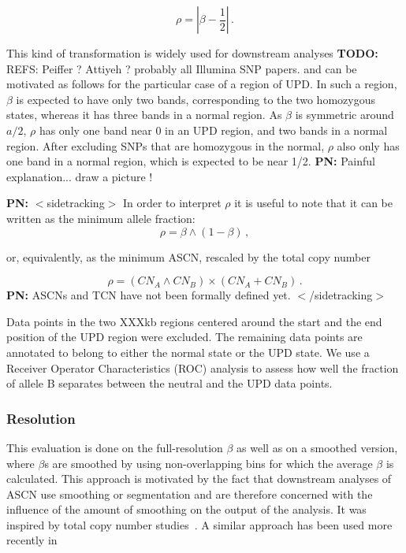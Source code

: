 \documentclass[10pt]{bmc_article}
\newenvironment{bmcformat}{\fussy\setboolean{publ}{true}}{\fussy}
\newenvironment{TODO}{\color{red}\textbf{TODO:}}{}
\newenvironment{PN}{\color{blue}\textbf{PN:}}{}
\begin{document}
\begin{bmcformat}
\begin{displaymath}
  \rho = \left\vert \beta - \frac{1}{2} \right\vert \,.
\end{displaymath}

This kind of transformation is widely used for downstream analyses
\begin{TODO}
  REFS: Peiffer ? Attiyeh ? probably all Illumina SNP papers.
\end{TODO}
 and can be motivated as follows for the particular case of a region of UPD. In such a region, $\beta$ is expected to have only two bands, corresponding to the two homozygous states, whereas it has three bands in a normal region. As $\beta$ is symmetric around $a/2$, $\rho$ has only one band near 0 in an UPD region, and two bands in a normal region. After excluding SNPs that are homozygous in the normal, $\rho$ also only has one band in a normal region, which is expected to be near 1/2. 
 \begin{PN}
   Painful explanation... draw a picture !
 \end{PN}

 \begin{PN}
   $<$sidetracking$>$
 \end{PN}
In order to interpret $\rho$ it is useful to note that it can be written as the minimum allele fraction:
\begin{displaymath}
  \rho = \beta \wedge (1-\beta)\,,
\end{displaymath}

or, equivalently, as the minimum ASCN, rescaled by the total copy number

\begin{displaymath}
  \rho = (CN_A \wedge CN_B) \times (CN_A + CN_B)\,.
\end{displaymath}
\begin{PN}
  ASCNs and TCN have not been formally defined yet.  $<$/sidetracking$>$
\end{PN}

Data points in the two XXXkb regions centered around the start and the end position of the UPD region were excluded. The remaining data points are annotated to belong to either the normal state or the UPD state. We use a  Receiver Operator Characteristics (ROC) analysis to assess how well the fraction of allele B separates between the neutral and the UPD data points.

\subsubsection*{Resolution}
This evaluation is done on the full-resolution $\beta$ as well as on a smoothed 
version, where $\beta$s are smoothed by using non-overlapping bins 
for which the average $\beta$ is calculated. This approach is motivated by the fact that downstream analyses of ASCN use smoothing or segmentation and are therefore concerned with the influence of the amount of smoothing on the output of the analysis. It was inspired 
by total copy number studies~\cite{LaiW_etal_2005,WillenbrockFridlyand_2005}. A similar approach has been used more recently in~\cite{BengtssonH_etal_2009b,BengtssonH_etal_2008}



\end{bmcformat}
\end{document}
